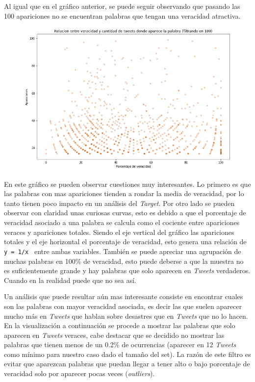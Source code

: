 \documentclass[titlepage,a4paper]{article}
\begin{document}
    Al igual que en el gráfico anterior, se puede seguir observando que pasando las 100 apariciones no se encuentran palabras que tengan una veracidad atractiva.
    
    \begin{figure}[H]
    \centering
    \includegraphics[width=1\textwidth]{graficos/Analisis Lexico Grafico/relacion_entre_aparicion_y_veracidad_filt_100.png}
    \caption{}
    \end{figure}
    
    En este gráfico se pueden observar cuestiones muy interesantes. Lo primero es que las palabras con mas apariciones tienden a rondar la media de veracidad, por lo tanto tienen poco impacto en un análisis del \textit{Target}.
    Por otro lado se pueden observar con claridad unas curiosas curvas, esto es debido a que el porcentaje de veracidad asociado a una palabra se calcula como el cociente entre apariciones veraces y apariciones totales. Siendo el eje vertical del gráfico las apariciones totales y el eje horizontal el porcentaje de veracidad, esto genera una relación de \texttt{ y = 1/x } entre ambas variables.
    También se puede apreciar una agrupación de muchas palabras en 100\% de veracidad, esto puede deberse a que la muestra no es suficientemente grande y hay palabras que solo aparecen en \textit{Tweets} verdaderos. Cuando en la realidad puede que no sea así.
    
    Un análisis que puede resultar aún mas interesante consiste en encontrar cuales son las palabras con mayor veracidad asociada, es decir las que suelen aparecer mucho más en \textit{Tweets} que hablan sobre desastres que en \textit{Tweets} que no lo hacen. En la visualización a continuación se procede a mostrar las palabras que solo aparecen en \textit{Tweets} veraces, cabe destacar que se decidido no mostrar las palabras que tienen menos de un 0.2\% de ocurrencias (aparecer en 12 \textit{Tweets} como mínimo para nuestro caso dado el tamaño del set). La razón de este filtro es evitar que aparezcan palabras que puedan llegar a tener alto o bajo porcentaje de veracidad solo por aparecer pocas veces (\textit{outliers}).
    
\end{document}
